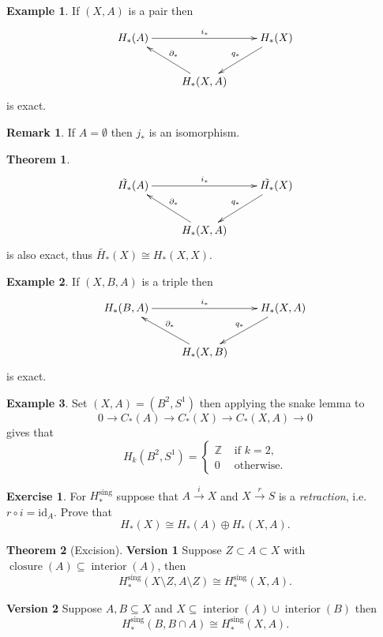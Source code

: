 \documentclass[12pt]{article}
\theoremstyle{definition}
\newtheorem*{thm}{Theorem}
\theoremstyle{definition}
\newtheorem*{ex}{Example}
\newtheorem*{exer}{Exercise}
\newtheorem*{rmk}{Remark}
\newcommand{\ZZ}{\mathbb{Z}}
\newcommand{\C}{C_*}
\renewcommand{\H}{H_*}
\begin{document}
\begin{ex}
If $(X,A)$ is a pair then 
\[
\xymatrix
{
 \H(A) \ar[rr]^{i_*}& &\H(X)\ar[dl]_{q_*} \\
 &\H(X,A) \ar[ul]_{\partial_*}&
}
\]
is exact.
\end{ex}

\begin{rmk}
If $A = \emptyset$ then $j_*$ is an isomorphism.
\end{rmk}

\begin{thm}
\[
\xymatrix
{
 \tilde{\H}(A) \ar[rr]^{i_*}& &\tilde{\H}(X)\ar[dl]_{q_*} \\
 &\H(X,A) \ar[ul]_{\partial_*}&
}
\]
is also exact, thus $\tilde{\H}(X) \cong \H(X,X)$.
\end{thm}

\begin{ex}
If $(X,B,A)$ is a triple then
\[
\xymatrix
{
 \H(B,A) \ar[rr]^{i_*}& &\H(X,A)\ar[dl]_{q_*} \\
 &\H(X,B) \ar[ul]_{\partial_*}&
}
\]
is exact.
\end{ex}

\begin{ex}
Set $(X,A) = (B^2, S^1)$ then applying the snake lemma to
\[
0 \to \C(A) \to \C(X)\to \C(X,A) \to 0
\]
gives that
\[
H_k(B^2, S^1) =\begin{cases}\ZZ&\text{ if }k=2,\\
0 &\text{ otherwise}.
\end{cases} 
\]
\end{ex}

\begin{exer}
For $\H^\text{sing}$ suppose that $A\xrightarrow{i} X$ and $X\xrightarrow{r} S$ is a \emph{retraction}, i.e. $r\circ i = \mathrm{id}_A$.
Prove that
\[
\H(X) \cong\H(A) \oplus \H(X,A).
\]
\end{exer}

\begin{thm}[Excision]

\textbf{Version 1}
Suppose $Z\subset A \subset X$ with $\operatorname{closure}(A) \subseteq \operatorname{interior}(A)$, then
\[
\H^\text{sing}(X\setminus Z, A\setminus Z) \cong \H^\text{sing}(X, A).
\]

\textbf{Version 2}
Suppose $A,B\subseteq X$ and $X \subseteq \operatorname{interior}(A) \cup \operatorname{interior}(B)$ then 
\[
\H^\text{sing}(B, B\cap A) \cong \H^\text{sing}(X, A).
\]
\end{thm}
\end{document}
